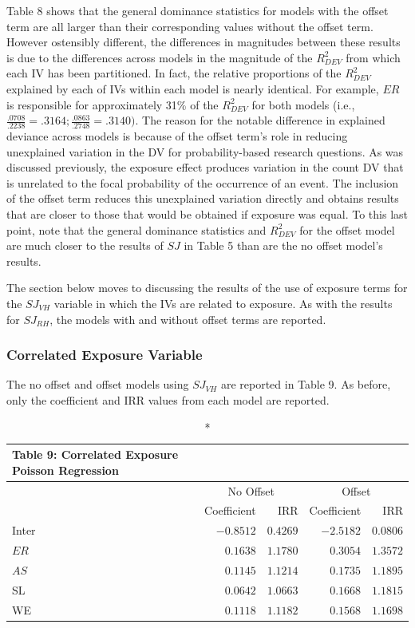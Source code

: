 \documentclass[ShortAfour,times,sageapa]{sagej}
\begin{document}
	Table 8 shows that the general dominance statistics for models with the offset term are all larger than their corresponding values without the offset term. 
	However ostensibly different, the differences in magnitudes between these results is due to the differences across models in the magnitude of the $R^2_{DEV}$ from which each IV has been partitioned.
	In fact, the relative proportions of the $R^2_{DEV}$ explained by each of IVs within each model is nearly identical.
	For example, $ER$ is responsible for approximately 31\% of the $R^2_{DEV}$ for both models (i.e., $\frac{.0708}{.2238} = .3164; \frac{.0863}{.2748} = .3140)$.
	The reason for the notable difference in explained deviance across models is because of the offset term's role in reducing unexplained variation in the DV for probability-based research questions.
	As was discussed previously, the exposure effect produces variation in the count DV that is unrelated to the focal probability of the occurrence of an event.
	The inclusion of the offset term reduces this unexplained variation directly and obtains results that are closer to those that would be obtained if exposure was equal.
	To this last point, note that the general dominance statistics and $R^2_{DEV}$ for the offset model are much closer to the results of $SJ$ in Table 5 than are the no offset model's results.
	
	The section below moves to discussing the results of the use of exposure terms for the $SJ_{VH}$ variable in which the IVs are related to exposure.
	As with the results for $SJ_{RH}$, the models with and without offset terms are reported.
	
		\subsubsection{Correlated Exposure Variable}
		
	The no offset and offset models using $SJ_{VH}$ are reported in Table 9.
	As before, only the coefficient and IRR values from each model are reported.
	
	\begin{longtable}{l|rrrr}
		\caption*{
			{\large Table 9: Correlated Exposure Poisson Regression}
		} \\ 
		\toprule
		\multicolumn{1}{l}{} & \multicolumn{2}{c}{No Offset} & \multicolumn{2}{c}{Offset} \\ 
		\cmidrule(lr){2-3} \cmidrule(lr){4-5}
		\multicolumn{1}{l}{} & Coefficient & IRR & Coefficient & IRR \\ 
		\midrule
		Inter & $-0.8512$ & $0.4269$ & $-2.5182$ & $0.0806$ \\ 
		$ER$ & $0.1638$ & $1.1780$ & $0.3054$ & $1.3572$ \\ 
		$AS$ & $0.1145$ & $1.1214$ & $0.1735$ & $1.1895$ \\ 
		SL & $0.0642$ & $1.0663$ & $0.1668$ & $1.1815$ \\ 
		WE & $0.1118$ & $1.1182$ & $0.1568$ & $1.1698$ \\ 
		\bottomrule
	\end{longtable}
	
\end{document}
